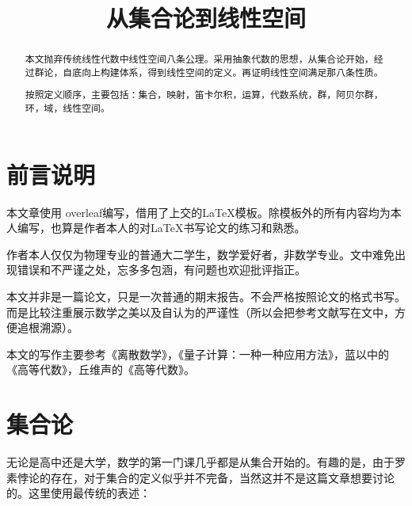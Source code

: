 \documentclass[12pt,hyperref,a4paper,UTF8]{ctexart}
\begin{document}
\cover
\thispagestyle{empty} %



\newpage
\begin{abstract}

本文抛弃传统线性代数中线性空间八条公理。采用抽象代数的思想，从集合论开始，经过群论，自底向上构建体系，得到线性空间的定义。再证明线性空间满足那八条性质。

按照定义顺序，主要包括：集合，映射，笛卡尔积，运算，代数系统，群，阿贝尔群，环，域，线性空间。

\end{abstract}

\vspace{1cm}

\tableofcontents

\newpage

\begin{center}
   \title{ \Huge \textbf{{从集合论到线性空间}}}
\end{center}

\section{前言说明}
本文章使用 overleaf编写，借用了上交的\LaTeX 模板。除模板外的所有内容均为本人编写，也算是作者本人的对\LaTeX 书写论文的练习和熟悉。

作者本人仅仅为物理专业的普通大二学生，数学爱好者，非数学专业。文中难免出现错误和不严谨之处，忘多多包涵，有问题也欢迎批评指正。

本文并非是一篇论文，只是一次普通的期末报告。不会严格按照论文的格式书写。而是比较注重展示数学之美以及自认为的严谨性（所以会把参考文献写在文中，方便追根溯源）。

本文的写作主要参考《离散数学》，《量子计算：一种一种应用方法》，蓝以中的《高等代数》，丘维声的《高等代数》。

\section{集合论}

无论是高中还是大学，数学的第一门课几乎都是从集合开始的。有趣的是，由于罗素悖论的存在，对于集合的定义似乎并不完备，当然这并不是这篇文章想要讨论的。这里使用最传统的表述：
\end{document}
